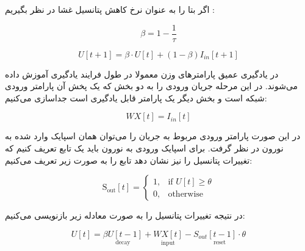 اگر بتا را به عنوان نرخ کاهش پتانسیل غشا در نظر بگیریم :

\begin{equation}
	\beta = 1 - \frac{1}{\tau}
\end{equation}

\begin{equation}
	U[t + 1] = \beta  \cdot U[t] + (1 - \beta)I_{in}[t+1]
\end{equation}
%

در یادگیری عمیق پارامتر‌های وزن معمولا در طول فرایند یادگیری آموزش داده می‌شوند. در این مرحله جریان ورودی را به دو بخش که یک پخش آن پارامتر ورودی شبکه است و بخش دیگر یک پارامتر قابل یادگیری است جداسازی می‌کنیم:


\begin{equation}
	WX[t] = I_{in}[t]
\end{equation}

%
%


در این صورت پارامتر ورودی مربوط به جریان را می‌توان همان اسپایک وارد شده به نورون در نظر گرفت. برای اسپایک ورودی به نورون باید یک تابع تعریف کنیم که تغییرات پتانسیل را نیز نشان دهد تابع را به صورت زیر تعریف می‌کنیم:

\begin{equation}
	\text{S}_{\text{out}}[t] = 
	\begin{cases}
		1, & \text{if } U[t] \geq {\theta} \\
		0, & \text{otherwise}
	\end{cases}
\end{equation}


در نتیجه تغییرات پتانسیل را به صورت معادله زیر بازنویسی می‌کنیم:

\begin{equation}
U[t] = \underset{\text{decay}}{\beta U[t-1]} + \underset{\text{input}}{WX[t]} - \underset{\text{reset}}{S_{out}[t-1] \cdot \theta}
\end{equation}


